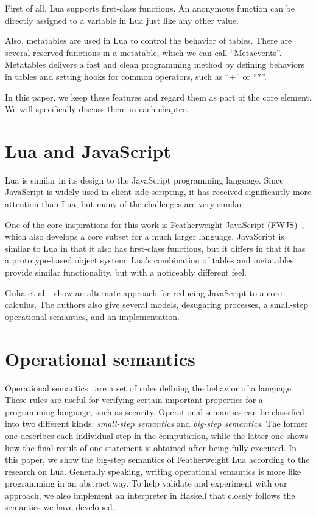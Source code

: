 First of all, Lua supports first-class functions. An anonymous function can be directly assigned to a variable in Lua just like any other value.

Also, metatables are used in Lua to control the behavior of tables.
There are several reserved functions in a metatable, which we can call ``Metaevents''.
Metatables delivers a fast and clean programming method by defining behaviors in tables and setting hooks for common operators, such as ``+'' or ``$\ast$''.

In this paper, we keep these features and regard them as part of the core element.
We will specifically discuss them in each chapter.

\section{Lua and JavaScript}
Lua is similar in its design to the JavaScript programming language. Since JavaScript is widely used in client-side scripting, it has received significantly more attention than Lua, but many of the challenges are very similar.

One of the core inspirations for this work is Featherweight JavaScript (FWJS)~\cite{FWJS}, which also develops a core subset for a much larger language.
JavaScript is similar to Lua in that it also has first-class functions, but it differs in that it has a prototype-based object system. Lua's combination of tables and metatables provide similar functionality, but with a noticeably different feel.

Guha et al.~\cite{EOJS} show an alternate approach for reducing JavaScript to a core calculus. The authors also give several models, desugaring processes, a small-step operational semantics, and an implementation.

\section{Operational semantics}
Operational semantics~\cite{AIOS} are a set of rules defining the behavior of a language.
These rules are useful for verifying certain important properties for a programming language, such as security. Operational semantics can be classified into two different kinds: \emph{small-step semantics} and \emph{big-step semantics}. The former one describes each individual step in the computation, while the latter one shows how the final result of one statement is obtained after being fully executed. In this paper, we show the big-step semantics of Featherweight Lua according to the research on Lua. Generally speaking, writing operational semantics is more like programming in an abstract way. To help validate and experiment with our approach, we also implement an interpreter in Haskell that closely follows the semantics we have developed.





